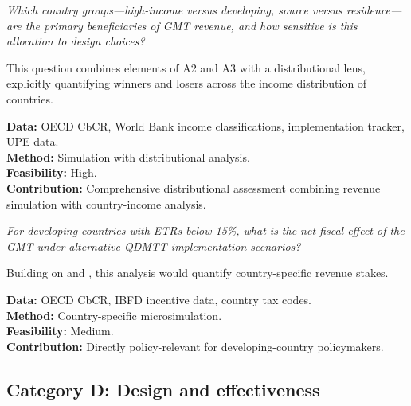 \documentclass[12pt,a4paper]{article}
\begin{document}
\begin{description}[style=nextline,leftmargin=2cm]

\item[C1. Geographic distribution of GMT revenue.]
\emph{Which country groups---high-income versus developing, source versus residence---are the primary beneficiaries of GMT revenue, and how sensitive is this allocation to design choices?}

This question combines elements of A2 and A3 with a distributional lens, explicitly quantifying winners and losers across the income distribution of countries.

\textbf{Data:} OECD CbCR, World Bank income classifications, implementation tracker, UPE data.\\
\textbf{Method:} Simulation with distributional analysis.\\
\textbf{Feasibility:} High.\\
\textbf{Contribution:} Comprehensive distributional assessment combining revenue simulation with country-income analysis.

\item[C2. GMT and developing-country tax incentives.]
\emph{For developing countries with ETRs below 15\%, what is the net fiscal effect of the GMT under alternative QDMTT implementation scenarios?}

Building on \textcite{liotti2022} and \textcite{vantriet2025}, this analysis would quantify country-specific revenue stakes.

\textbf{Data:} OECD CbCR, IBFD incentive data, country tax codes.\\
\textbf{Method:} Country-specific microsimulation.\\
\textbf{Feasibility:} Medium.\\
\textbf{Contribution:} Directly policy-relevant for developing-country policymakers.

\end{description}

\subsection{Category D: Design and effectiveness}
\end{document}

